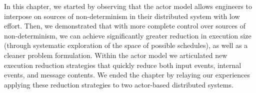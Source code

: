 In this chapter, we started by observing that the actor model allows engineers to interpose
on sources of non-determinism in their distributed system with low effort.
Then, we demonstrated that with
more complete control over sources of non-determinism, we can achieve
significantly greater reduction in execution size (through systematic
exploration of the space of possible schedules), as well as a cleaner
problem formulation. Within the actor model we articulated new execution
reduction
strategies that quickly reduce both input events,
internal events, and message contents. We ended the chapter by relaying our
experiences applying these reduction strategies to two actor-based
distributed systems.

